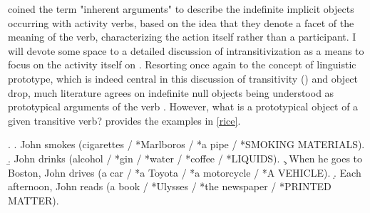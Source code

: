 \textcite[122]{vanvalinlapolla1997syntax} coined the term "inherent arguments" to describe the indefinite implicit objects occurring with activity verbs, based on the idea that they denote a facet of the meaning of the verb, characterizing the action itself rather than a participant. I will devote some space to a detailed discussion of intransitivization as a means to focus on the activity itself on . Resorting once again to the concept of linguistic prototype, which is indeed central in this discussion of transitivity () and object drop, much literature agrees on indefinite null objects being understood as prototypical arguments of the verb \parencite{Rice1988, Naess2007, bresnan1978realistic, Melchin2019, Mittwoch2005, Dvorak2017thesis, Levin1993, Lorenzetti2008, quirk1985grammar}. However, what is a prototypical object of a given transitive verb? \textcite[204]{Rice1988} provides the examples in \ref{rice}.

\ex. \label{rice} \a. \label{rice1} John smokes (cigarettes / *Marlboros / *a pipe / *SMOKING MATERIALS).
\b. \label{rice2} John drinks (alcohol / *gin / *water / *coffee / *LIQUIDS).
\c. \label{rice3} When he goes to Boston, John drives (a car / *a Toyota / *a motorcycle / *A VEHICLE).
\d. \label{rice4} Each afternoon, John reads (a book / *Ulysses / *the newspaper / *PRINTED MATTER).

